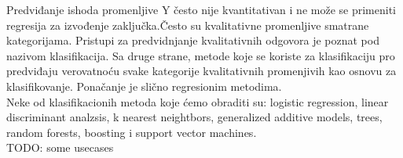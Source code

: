 

\ifpdf
    \graphicspath{{Chapter2/Figs/Raster/}{Chapter2/Figs/PDF/}{Chapter2/Figs/}}
\else
    \graphicspath{{Chapter2/Figs/Vector/}{Chapter2/Figs/}}
\fi


Predviđanje ishoda promenljive Y često nije kvantitativan i ne može se primeniti
regresija za izvođenje zaključka.Često su kvalitativne promenljive smatrane
kategorijama. Pristupi za predvidnjanje kvalitativnih odgovora je poznat pod
nazivom klasifikacija. Sa druge strane, metode koje se koriste za klasifikaciju
pro predviđaju verovatnoću svake kategorije kvalitativnih promenjivih kao osnovu
za klasifikovanje. Ponačanje je slično regresionim metodima. \\

Neke od klasifikacionih metoda koje ćemo obraditi su: logistic regression,
linear discriminant analzsis, k nearest neightbors, generalized additive models,
trees, random forests, boosting i support vector machines. \\

TODO: some usecases
\clearpage

\clearpage

\clearpage

